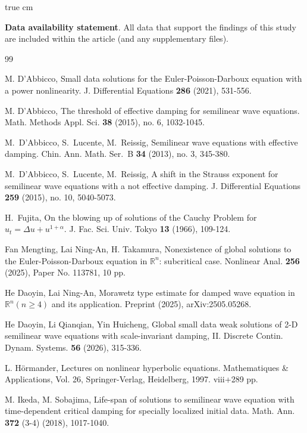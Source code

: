 \documentclass[11pt,twoside]{article}
\newcommand{\R}{\mathbb R}
\newcommand{\al}{\alpha}
\theoremstyle{plain}
\theoremstyle{definition}
\theoremstyle{remark}
\numberwithin{equation}{section}
\begin{document}
 true cm

{\bf Data availability statement}. All data that support the findings of this study
are included within the article (and any supplementary files).



\begin{thebibliography}{99}



  M. D'Abbicco, Small data solutions for the Euler-Poisson-Darboux equation with a
power nonlinearity. J. Differential Equations \textbf{286} (2021), 531-556.


M. D'Abbicco, The threshold of effective damping for semilinear wave equations.
Math. Methods Appl. Sci. \textbf{38} (2015),  no. 6, 1032-1045.

 M.~D'Abbicco, S.~Lucente, M.~Reissig,
Semilinear wave equations with effective damping.
Chin. Ann. Math. Ser.~B \textbf{34} (2013), no. 3, 345-380.



 M.~D'Abbicco, S.~Lucente, M.~Reissig, A
shift in the Strauss exponent for semilinear wave equations with a
not effective damping. J. Differential Equations \textbf{259} (2015),
no. 10, 5040-5073.



 H.~Fujita, On the blowing up of solutions of the
Cauchy Problem for $u_t=\Delta u+u^{1+\al}$.
J. Fac. Sci. Univ. Tokyo \textbf{13} (1966), 109-124.

Fan Mengting, Lai Ning-An, H. Takamura, Nonexistence of global solutions to the Euler-Poisson-Darboux equation in $\R^n$:
subcritical case. Nonlinear Anal. {\bf 256} (2025), Paper No. 113781, 10 pp.



 He Daoyin, Lai Ning-An, Morawetz type estimate for damped wave equation in $\R^n (n\geq 4)$ and its application.
Preprint (2025), arXiv:2505.05268.



 He Daoyin, Li Qianqian, Yin Huicheng,
Global small data weak solutions of 2-D semilinear wave equations
with  scale-invariant  damping, II. Discrete Contin. Dynam. Systems. {\bf 56} (2026), 315-336.


 L. H\"ormander, Lectures on nonlinear hyperbolic equations.
Mathematiques \& Applications, Vol. 26, Springer-Verlag, Heidelberg, 1997. viii+289 pp.


M. Ikeda, M. Sobajima, Life-span of solutions to semilinear wave equation with time-dependent critical damping for specially
localized initial data. Math. Ann. \textbf{372} (3-4) (2018), 1017-1040.


\end{thebibliography}
\end{document}
